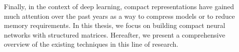 Finally, in the context of deep learning, compact representations have gained much attention over the past years as a way to compress models or to reduce memory requirements.
In this thesis, we focus on building compact neural networks with structured matrices.
Hereafter, we present a comprehensive overview of the existing techniques in this line of research.




%
%

%




